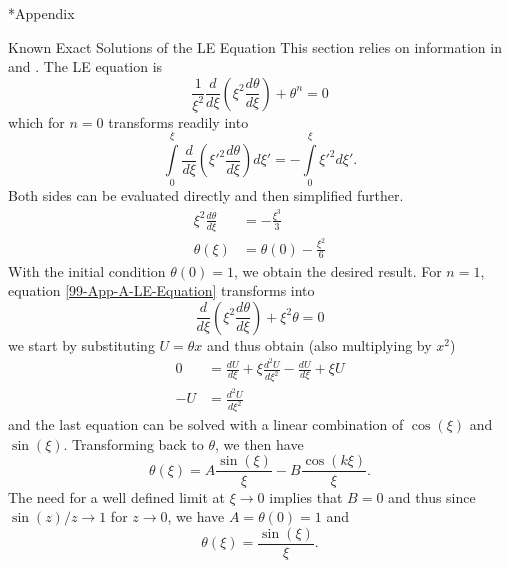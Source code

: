 \begin{appendix}
\renewcommand{\thesection}{\Alph{section}}
\renewcommand{\thesubsection}{\Alph{subsection}}

\begin{section}*{Appendix}
%
%
\begin{subsection}{Known Exact Solutions of the LE Equation}
\label{99-App-A-Exact-LE-Solutions}
This section relies on information in \cite{weissteinLaneEmdenDifferentialEquation2020} and \cite{chandrasekharChandrasekharAnIntroductionStudy1958}. The LE equation is
\begin{equation}
	\frac{1}{\xi^2}\frac{d}{d\xi}\left(\xi^2\frac{d\theta}{d\xi}\right)+\theta^n=0
	\label{99-App-A-LE-Equation}
\end{equation}
which for $n=0$ transforms readily into
\begin{equation}
	\int\limits_0^\xi\frac{d}{d\xi}\left(\xi'^2\frac{d\theta}{d\xi}\right)d\xi' = -\int\limits_0^\xi\xi'^2d\xi'.
\end{equation}
Both sides can be evaluated directly and then simplified further.
\begin{align}
	\xi^2\frac{d\theta}{d\xi} &= -\frac{\xi^3}{3}\\
	\theta(\xi) &= \theta(0)-\frac{\xi^2}{6}
\end{align}
With the initial condition $\theta(0)=1$, we obtain the desired result. For $n=1$, equation \ref{99-App-A-LE-Equation} transforms into
\begin{equation}
	\frac{d}{d\xi}\left(\xi^2\frac{d\theta}{d\xi}\right)+\xi^2\theta=0
\end{equation}
we start by substituting $U=\theta x$ and thus obtain (also multiplying by $x^2$)
\begin{align}
	0 &= \frac{dU}{d\xi} + \xi\frac{d^2U}{d\xi^2} - \frac{dU}{d\xi} + \xi U\\
	-U &= \frac{d^2U}{d\xi^2}
\end{align}
and the last equation can be solved with a linear combination of $\cos(\xi)$ and $\sin(\xi)$. Transforming back to $\theta$, we then have
\begin{equation}
	\theta(\xi) = A\frac{\sin(\xi)}{\xi} - B\frac{\cos(k\xi)}{\xi}.
\end{equation}
The need for a well defined limit at $\xi\rightarrow0$ implies that $B=0$ and thus since $\sin(z)/z\rightarrow1$ for $z\rightarrow0$, we have $A=\theta(0)=1$ and 
\begin{equation}
	\theta(\xi) = \frac{\sin(\xi)}{\xi}.

\end{equation}
\end{subsection}
\end{section}
\end{appendix}
